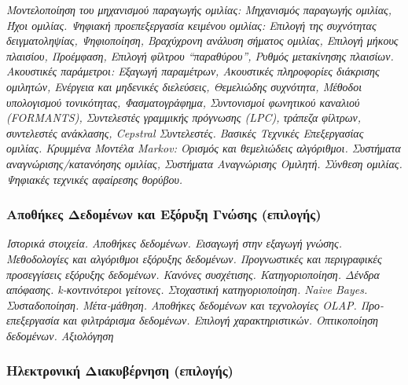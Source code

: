 \emph{Μοντελοποίηση του μηχανισμού παραγωγής ομιλίας: Μηχανισμός
παραγωγής ομιλίας, Ήχοι ομιλίας. Ψηφιακή προεπεξεργασία κειμένου
ομιλίας: Επιλογή της συχνότητας δειγματοληψίας, Ψηφιοποίηση, Βραχύχρονη
ανάλυση σήματος ομιλίας, Επιλογή μήκους πλαισίου, Προέμφαση, Επιλογή
φίλτρου ``παραθύρου'', Ρυθμός μετακίνησης πλαισίων. Ακουστικές
παράμετροι: Εξαγωγή παραμέτρων, Ακουστικές πληροφορίες διάκρισης
ομιλητών, Ενέργεια και μηδενικές διελεύσεις, Θεμελιώδης συχνότητα,
Μέθοδοι υπολογισμού τονικότητας, Φασματογράφημα, Συντονισμοί φωνητικού
καναλιού (FORMANTS), Συντελεστές γραμμικής πρόγνωσης (LPC), τράπεζα
φίλτρων, συντελεστές ανάκλασης, Cepstral Συντελεστές. Βασικές Τεχνικές
Επεξεργασίας ομιλίας. Κρυμμένα Μοντέλα Μarkov: Ορισμός και θεμελιώδεις
αλγόριθμοι. Συστήματα αναγνώρισης/κατανόησης ομιλίας, Συστήματα
Αναγνώρισης Ομιλητή. Σύνθεση ομιλίας. Ψηφιακές τεχνικές αφαίρεσης
θορύβου.}

\hypertarget{ux3b1ux3c0ux3bfux3b8ux3aeux3baux3b5ux3c2-ux3b4ux3b5ux3b4ux3bfux3bcux3adux3bdux3c9ux3bd-ux3baux3b1ux3b9-ux3b5ux3beux3ccux3c1ux3c5ux3beux3b7-ux3b3ux3bdux3ceux3c3ux3b7ux3c2-ux3b5ux3c0ux3b9ux3bbux3bfux3b3ux3aeux3c2}{%
\subsubsection{Αποθήκες Δεδομένων και Εξόρυξη Γνώσης
(επιλογής)}\label{ux3b1ux3c0ux3bfux3b8ux3aeux3baux3b5ux3c2-ux3b4ux3b5ux3b4ux3bfux3bcux3adux3bdux3c9ux3bd-ux3baux3b1ux3b9-ux3b5ux3beux3ccux3c1ux3c5ux3beux3b7-ux3b3ux3bdux3ceux3c3ux3b7ux3c2-ux3b5ux3c0ux3b9ux3bbux3bfux3b3ux3aeux3c2}}

\emph{Ιστορικά στοιχεία. Αποθήκες δεδομένων. Εισαγωγή στην εξαγωγή
γνώσης. Μεθοδολογίες και αλγόριθμοι εξόρυξης δεδομένων. Προγνωστικές και
περιγραφικές προσεγγίσεις εξόρυξης δεδομένων. Κανόνες συσχέτισης.
Κατηγοριοποίηση. Δένδρα απόφασης. k-κοντινότεροι γείτονες. Στοχαστική
κατηγοριοποίηση. Naive Bayes. Συσταδοποίηση. Μέτα-μάθηση. Αποθήκες
δεδομένων και τεχνολογίες OLAP. Προ-επεξεργασία και φιλτράρισμα
δεδομένων. Επιλογή χαρακτηριστικών. Οπτικοποίηση δεδομένων. Αξιολόγηση}

\hypertarget{ux3b7ux3bbux3b5ux3baux3c4ux3c1ux3bfux3bdux3b9ux3baux3ae-ux3b4ux3b9ux3b1ux3baux3c5ux3b2ux3adux3c1ux3bdux3b7ux3c3ux3b7-ux3b5ux3c0ux3b9ux3bbux3bfux3b3ux3aeux3c2}{%
\subsubsection{Ηλεκτρονική Διακυβέρνηση
(επιλογής)}\label{ux3b7ux3bbux3b5ux3baux3c4ux3c1ux3bfux3bdux3b9ux3baux3ae-ux3b4ux3b9ux3b1ux3baux3c5ux3b2ux3adux3c1ux3bdux3b7ux3c3ux3b7-ux3b5ux3c0ux3b9ux3bbux3bfux3b3ux3aeux3c2}}

